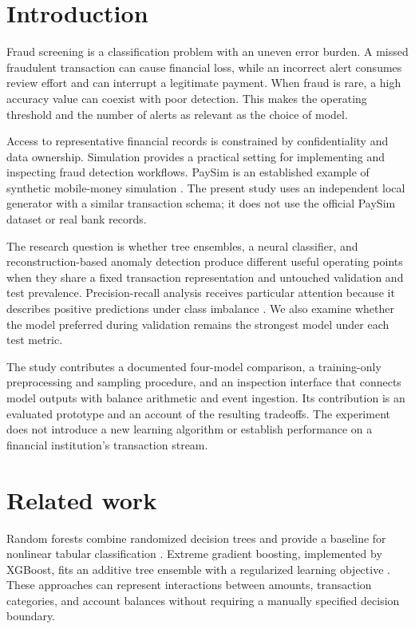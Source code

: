 \documentclass[conference]{IEEEtran}
\begin{document}
\section{Introduction}
Fraud screening is a classification problem with an uneven error burden. A missed fraudulent transaction can cause financial loss, while an incorrect alert consumes review effort and can interrupt a legitimate payment. When fraud is rare, a high accuracy value can coexist with poor detection. This makes the operating threshold and the number of alerts as relevant as the choice of model.

Access to representative financial records is constrained by confidentiality and data ownership. Simulation provides a practical setting for implementing and inspecting fraud detection workflows. PaySim is an established example of synthetic mobile-money simulation \cite{r1}. The present study uses an independent local generator with a similar transaction schema; it does not use the official PaySim dataset or real bank records.

The research question is whether tree ensembles, a neural classifier, and reconstruction-based anomaly detection produce different useful operating points when they share a fixed transaction representation and untouched validation and test prevalence. Precision-recall analysis receives particular attention because it describes positive predictions under class imbalance \cite{r2}. We also examine whether the model preferred during validation remains the strongest model under each test metric.

The study contributes a documented four-model comparison, a training-only preprocessing and sampling procedure, and an inspection interface that connects model outputs with balance arithmetic and event ingestion. Its contribution is an evaluated prototype and an account of the resulting tradeoffs. The experiment does not introduce a new learning algorithm or establish performance on a financial institution's transaction stream.

\section{Related work}
Random forests combine randomized decision trees and provide a baseline for nonlinear tabular classification \cite{r3}. Extreme gradient boosting, implemented by XGBoost, fits an additive tree ensemble with a regularized learning objective \cite{r4}. These approaches can represent interactions between amounts, transaction categories, and account balances without requiring a manually specified decision boundary.
\end{document}
